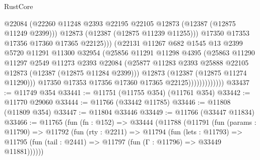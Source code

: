 \begin{lexlean}{RustCore}
\begin{coremodule}
                                  @22084
                                  (@22260
                                    @11248
                                    @2393
                                    @22195
                                    @22105
                                    @12873
                                    (@12387 (@12875 @11249 @2399)))
                                  @12873
                                  (@12387 (@12875 @11239 @11255)))
                                @17350
                                @17353
                                @17356
                                @17360
                                @17365
                                @22125)))
                          (@22131
                            @11267
                            @682
                            @1545
                            @13
                            @2399
                            @5720
                            @11291
                            @11300
                            @32954
                            (@25856
                              @11291
                              @11298
                              @4395
                              (@25863
                                @11290
                                @11297
                                @2549
                                @11273
                                @2393
                                @22084
                                (@25877
                                  @11283
                                  @2393
                                  @25888
                                  @22105
                                  @12873
                                  (@12387 (@12875 @11284 @2399)))
                                @12873
                                (@12387 (@12875 @11274 @11290)))
                              @17350
                              @17353
                              @17356
                              @17360
                              @17365
                              @22125)))))))))))))
@33437 := @11749 @354
@33441 := @11751 (@11755 @354) (@11761 @354)
@33442 := @11770 @29060
@33444 := @11766 (@33442 @11785)
@33446 := @11808 (@11809 @354)
@33447 := @11804 @33446
@33449 := @11766 (@33447 @11834)
@33466 := @11765
    (fun (fn : @152) =>
    @33444
      (@11788
        (@11791
          (fun (params : @11790) =>
          @11792
            (fun (rty : @2211) =>
            @11794
              (fun (lets : @11793) =>
              @11795 (fun (tail : @2441) => @11797 (fun (Γ : @11796) => @33449 @11881))))))

\end{coremodule}
\end{lexlean}
